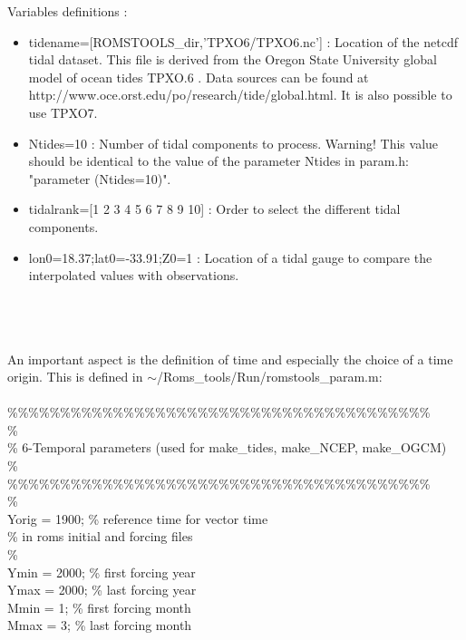 Variables definitions :
\begin{itemize}
\item tidename=[ROMSTOOLS\_dir,'TPXO6/TPXO6.nc'] : Location of the netcdf tidal dataset. 
This file is derived from the Oregon State University global model of ocean tides TPXO.6 
\citep{Egb02}.  Data sources can be found at \\
http://www.oce.orst.edu/po/research/tide/global.html.
It is also possible to use TPXO7.
\item Ntides=10 : Number of tidal components to process. Warning!
This value should be identical to the value of the parameter Ntides in param.h:
"parameter (Ntides=10)".
\item tidalrank=[1 2 3 4 5 6 7 8 9 10] : Order to select the different tidal components.
\item lon0=18.37;lat0=-33.91;Z0=1 : Location of a tidal gauge to compare the interpolated values
with observations. \\\\\\\\
\end{itemize}
An important aspect is the definition of time and especially the choice of a 
time origin. This is defined in $\sim$/Roms\_tools/Run/romstools\_param.m:
\\
\\
\%\%\%\%\%\%\%\%\%\%\%\%\%\%\%\%\%\%\%\%\%\%\%\%\%\%\%\%\%\%\%\%\%\%\%\%\%\%\%\%\\
\%\\
\% 6-Temporal parameters (used for make\_tides, make\_NCEP, make\_OGCM)\\
\%\\
\%\%\%\%\%\%\%\%\%\%\%\%\%\%\%\%\%\%\%\%\%\%\%\%\%\%\%\%\%\%\%\%\%\%\%\%\%\%\%\%\\
\%\\
Yorig         = 1900;               \% reference time for vector time\\
                                    \% in roms initial and forcing files\\
\%\\
Ymin          = 2000;               \% first forcing year\\
Ymax          = 2000;               \% last  forcing year\\
Mmin          = 1;                  \% first forcing month\\
Mmax          = 3;                  \% last  forcing month\\
